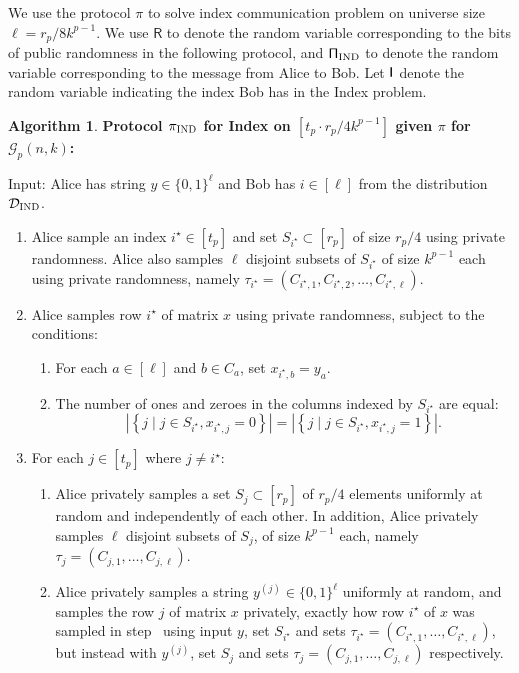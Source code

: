 \documentclass[11pt]{article}
\theoremstyle{definition}
\newenvironment{ourbox}{\begin{mdframed}[hidealllines=false,innerleftmargin=10pt,backgroundcolor=white!10,innertopmargin=5pt,innerbottommargin=5pt,roundcorner=10pt]}{\end{mdframed}}
\newtheorem{mdalgorithm}{Algorithm}
\newenvironment{Algorithm}{\begin{ourbox}\begin{mdalgorithm}}{\end{mdalgorithm}\end{ourbox}}
\newcommand{\card}[1]{\left\vert{#1}\right\vert}
\newcommand{\set}[1]{\ensuremath{\left\{ #1 \right\}}}
\newcommand{\rv}[1]{\ensuremath{{\mathsf{#1}}}\xspace}
\newcommand{\cG}{\ensuremath{\mathcal{G}}}
\newcommand{\istar}{\ensuremath{i^{\star}}}
\newcommand{\prot}{\ensuremath{\pi}}
\newcommand{\rR}{\ensuremath{\rv{R}}}
\newcommand{\protindex}{\ensuremath{\prot_{\textnormal{\textsc{IND}}}}}
\begin{document}
	We use the protocol $\prot$ to solve index communication problem on universe size $\ell = r_p/8k^{p-1}$. 
	We use $\rR$ to denote the random variable corresponding to the bits of public randomness in the following protocol, and $\rProtIND$ to denote the random variable corresponding to the message from Alice to Bob. Let $\rI$ denote the random variable indicating the index Bob has in the Index problem.
	\begin{Algorithm}
		\textbf{Protocol $\protindex$ for Index on $[t_p \cdot r_p/4k^{p-1}]$ given $\prot$ for $\cG_p(n,k)$:} 
		
		Input: Alice has string $y \in \{0,1\}^{\ell}$ and Bob has $i \in [\ell]$  from the distribution $\mathcal{D}_{\textnormal{\textsc{IND}}}$. 

		
		\begin{enumerate}[label=$(\roman*)$]
			\item Alice sample an index $\istar \in [t_p]$ and set $S_{\istar} \subset [r_p]$ of size $r_p/4$ using private randomness. Alice also samples $\ell$ disjoint subsets of $S_{\istar}$ of size $k^{p-1}$ each using private randomness, namely $\tau_{\istar} = (C_{\istar, 1}, C_{\istar, 2}, \ldots, C_{\istar, \ell})$.\label{part:alice-sampling-partitions}
			\item Alice samples row $\istar$ of matrix $x$ using private randomness, subject to the conditions:
			\begin{enumerate}
				\item \label{item:row-istar-fix-by-Y} For each $a \in [\ell]$ and $b \in C_a$, set $x_{\istar, b} = y_a$. 
				\item The number of ones and zeroes in the columns indexed by $S_{\istar}$ are equal:
				\[
				\card{\set{j \mid j \in S_{\istar}, x_{\istar, j} = 0}} = \card{\set{j \mid j \in S_{\istar}, x_{\istar, j} = 1}}.
				\]
			\end{enumerate} 
			\item For each $j \in [t_p]$ where $j \neq \istar$:
			\begin{enumerate}
				\item Alice privately samples a set $S_j \subset [r_p]$ of $r_p/4$ elements uniformly at random and independently of each other. 
			In addition, Alice privately samples $\ell$ disjoint subsets of $S_j$, of size $k^{p-1}$ each, namely $\tau_j = (C_{j,1}, \ldots, C_{j, \ell})$. 
			\item Alice privately samples a string $y^{(j)} \in \{0,1\}^{\ell}$ uniformly at random, and samples the row $j$ of matrix $x$ privately, exactly how row $\istar$ of $x$ was sampled in step~ using input $y$, set $S_{\istar}$ and sets $\tau_{\istar} = (C_{\istar, 1}, \ldots, C_{\istar, \ell})$, but instead with $y^{(j)}$, set $S_j$ and sets $\tau_j = (C_{j,1}, \ldots, C_{j, \ell})$ respectively. 

\end{enumerate}
\end{enumerate}
\end{Algorithm}
\end{document}
